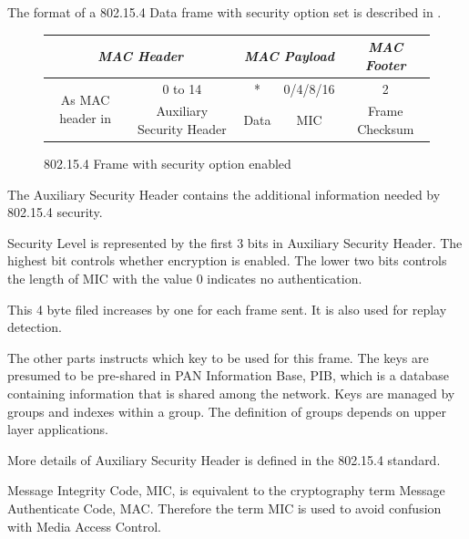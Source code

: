 The format of a 802.15.4 Data frame with security option set is described in .

\begin{figure}[h!]
	\centering
	\begin{tabular}{|c|c|c|c|c|c|c|}
		\multicolumn{4}{c}{\textit{MAC Header}}                                                             & \multicolumn{2}{c}{\textit{MAC Payload}} & \multicolumn{1}{c}{\textit{MAC Footer}}     \\ \hline
		\multicolumn{3}{|c|}{\multirow{2}{*}{As MAC header in \Cref{Fig: 802154 frame}}} & 0 to 14                    & *             & 0/4/8/16         & 2              \\ \cline{4-7} 
		\multicolumn{3}{|c|}{}                                           & Auxiliary Security Header & Data          & MIC              & Frame Checksum \\ \hline
	\end{tabular}
	\caption{802.15.4 Frame with security option enabled} \label{Fig: 802154 sec frame}
\end{figure}

The Auxiliary Security Header contains the additional information needed by 802.15.4 security.

\begin{description}[style=nextline]
	\item[\textbf{Security Level}]
	Security Level is represented by the first 3 bits in Auxiliary Security Header. The highest bit controls whether encryption is enabled. The lower two bits controls the length of MIC with the value $0$ indicates no authentication.
	\item[\textbf{Frame Counter}]
	This 4 byte filed increases by one for each frame sent. It is also used for replay detection.
	\item[\textbf{Key Strategy}]
	The other parts instructs which key to be used for this frame. The keys are presumed to be pre-shared in PAN Information Base, PIB, which is a database containing information that is shared among the network. Keys are managed by groups and indexes within a group. The definition of groups depends on upper layer applications.
\end{description}

More details of Auxiliary Security Header is defined in the 802.15.4 standard.

Message Integrity Code, MIC, is equivalent to the cryptography term Message Authenticate Code, MAC. Therefore the term MIC is used to avoid confusion with Media Access Control.

